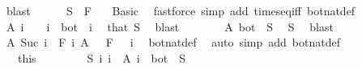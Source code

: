\begin{isabellebody}
\ blast\isanewline
\ \ \ \ \isamarkupfalse%
\ {\isachardoublequoteopen}S\ {\isasymin}\ F\ {}{\isachardoublequoteclose}\ \isamarkupfalse%
\ Basic\ \isamarkupfalse%
\ {\isacharparenleft}{\kern0pt}fastforce\ simp\ add{\isacharcolon}{\kern0pt}\ times{\isacharunderscore}{\kern0pt}eq{\isacharunderscore}{\kern0pt}iff\ bot{\isacharunderscore}{\kern0pt}nat{\isacharunderscore}{\kern0pt}def{\isacharparenright}{\kern0pt}\isanewline
\ \ \ \ \isamarkupfalse%
\ \isamarkupfalse%
\ {\isachardoublequoteopen}A\ i\ {\isacharequal}{\kern0pt}\ {\isacharbraceleft}{\kern0pt}{\isacharbraceright}{\kern0pt}{\isachardoublequoteclose}\ \ {\isachardoublequoteopen}i\ {\isasymnoteq}\ bot{\isachardoublequoteclose}\ \ i\ \isamarkupfalse%
\ that\ S\ \isamarkupfalse%
\ blast\isanewline
\ \ \ \ \isamarkupfalse%
\ \isamarkupfalse%
\ {\isachardoublequoteopen}A\ bot\ {\isacharequal}{\kern0pt}\ S{\isachardoublequoteclose}\ \isamarkupfalse%
\ S\ \isamarkupfalse%
\ blast\isanewline
\ \ \ \ \isamarkupfalse%
\ \isamarkupfalse%
\ {\isachardoublequoteopen}A\ {\isacharparenleft}{\kern0pt}Suc\ i{\isacharparenright}{\kern0pt}\ {\isasymin}\ F\ i{\isachardoublequoteclose}\ {\isachardoublequoteopen}A\ {}\ {\isasymin}\ F\ {}{\isachardoublequoteclose}\ \ i\ \isamarkupfalse%
\ bot{\isacharunderscore}{\kern0pt}nat{\isacharunderscore}{\kern0pt}def\ \isamarkupfalse%
\ {\isacharparenleft}{\kern0pt}auto\ simp\ add{\isacharcolon}{\kern0pt}\ bot{\isacharunderscore}{\kern0pt}nat{\isacharunderscore}{\kern0pt}def{\isacharparenright}{\kern0pt}\isanewline
\ \ \isacommand{{\isacharbraceright}{\kern0pt}}\isamarkupfalse%
\isanewline
\ \ \isamarkupfalse%
\ {\isacharasterisk}{\kern0pt}\ {\isacharequal}{\kern0pt}\ this\isanewline
\ \ \isacommand{{\isacharbraceleft}{\kern0pt}}\isamarkupfalse%
\isanewline
\ \ \ \ \isamarkupfalse%
\ {\isachardoublequoteopen}{\isasymnexists}S{\isachardot}{\kern0pt}\ {\isacharparenleft}{\kern0pt}{\isasymUnion}i{\isachardot}{\kern0pt}\ {\isacharbraceleft}{\kern0pt}i{\isacharbraceright}{\kern0pt}\ {\isasymtimes}\ A\ i{\isacharparenright}{\kern0pt}\ {\isacharequal}{\kern0pt}\ {\isacharbraceleft}{\kern0pt}bot{\isacharbraceright}{\kern0pt}\ {\isasymtimes}\ S{\isachardoublequoteclose}\isanewline
\ \ \ \ \isamarkupfalse%

\end{isabellebody}
